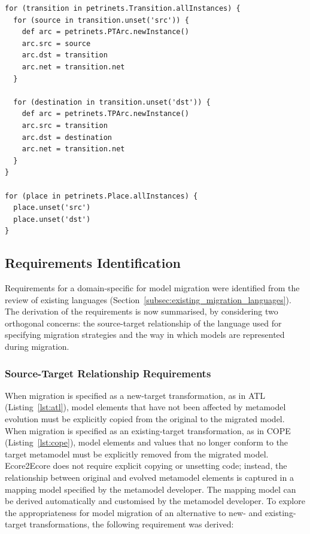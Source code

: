 \begin{lstlisting}[caption=Petri nets model migration in COPE, label=lst:cope, language=COPE]
for (transition in petrinets.Transition.allInstances) {
  for (source in transition.unset('src')) {
    def arc = petrinets.PTArc.newInstance()
    arc.src = source
    arc.dst = transition
    arc.net = transition.net
  }
  
  for (destination in transition.unset('dst')) {
    def arc = petrinets.TPArc.newInstance() 
    arc.src = transition
    arc.dst = destination
    arc.net = transition.net
  }
}

for (place in petrinets.Place.allInstances) {
  place.unset('src')
  place.unset('dst')
}
\end{lstlisting}

\subsection{Requirements Identification}
\label{subsec:analysis}
Requirements for a domain-specific for model migration were identified from the review of existing languages (Section~\ref{subsec:existing_migration_languages}). The derivation of the requirements is now summarised, by considering two orthogonal concerns: the source-target relationship of the language used for specifying migration strategies and the way in which models are represented during migration. %


\subsubsection{Source-Target Relationship Requirements}
When migration is specified as a new-target transformation, as in ATL (Listing~\ref{lst:atl}), model elements that have not been affected by metamodel evolution must be explicitly copied from the original to the migrated model. When migration is specified as an existing-target transformation, as in COPE (Listing~\ref{lst:cope}), model elements and values that no longer conform to the target metamodel must be explicitly removed from the migrated model. Ecore2Ecore does not require explicit copying or unsetting code; instead, the relationship between original and evolved metamodel elements is captured in a mapping model specified by the metamodel developer. The mapping model can be derived automatically and customised by the metamodel developer. To explore the appropriateness for model migration of an alternative to new- and existing-target transformations, the following requirement was derived:

